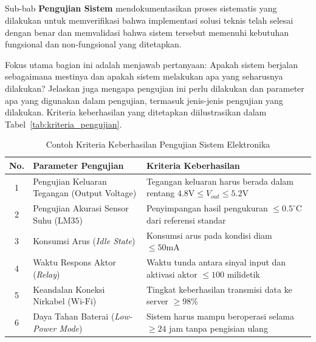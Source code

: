 \documentclass{elsinta}
\begin{document}
\subsection{\SystemTestingTitle}


Sub-bab \textbf{Pengujian Sistem} mendokumentasikan proses sistematis yang dilakukan untuk memverifikasi bahwa implementasi solusi teknis telah selesai dengan benar dan memvalidasi bahwa sistem tersebut memenuhi kebutuhan fungsional dan non-fungsional yang ditetapkan.

Fokus utama bagian ini adalah menjawab pertanyaan: Apakah sistem berjalan sebagaimana mestinya dan apakah sistem melakukan apa yang seharusnya dilakukan?
Jelaskan juga mengapa pengujian ini perlu dilakukan dan  parameter apa yang digunakan dalam pengujian, termasuk jenis-jenis pengujian yang dilakukan. Kriteria keberhasilan yang ditetapkan diilustrasikan dalam Tabel~\ref{tab:kriteria_pengujian}.

\begin{longtable}{|c|p{5cm}|p{8cm}|}
    \caption{Contoh Kriteria Keberhasilan Pengujian Sistem Elektronika}
    \label{tab:kriteria_pengujian_elektro}
    \\ %

    \hline
    \textbf{No.} & \textbf{Parameter Pengujian} & \textbf{Kriteria Keberhasilan} \\
    \hline
    \endhead %

    \hline
    1 & Pengujian Keluaran Tegangan (Output Voltage) & Tegangan keluaran harus berada dalam rentang $4.8 \text{V} \leq V_{out} \leq 5.2 \text{V}$ \\
    \hline
    2 & Pengujian Akurasi Sensor Suhu ($\text{LM35}$) & Penyimpangan hasil pengukuran $\leq 0.5^\circ \text{C}$ dari referensi standar \\
    \hline
    3 & Konsumsi Arus (\textit{Idle State}) & Konsumsi arus pada kondisi diam $\leq 50 \text{mA}$ \\
    \hline
    4 & Waktu Respons Aktor (\textit{Relay}) & Waktu tunda antara sinyal input dan aktivasi aktor $\leq 100$ milidetik \\
    \hline
    5 & Keandalan Koneksi Nirkabel ($\text{Wi-Fi}$) & Tingkat keberhasilan transmisi data ke server $\geq 98\%$ \\
    \hline
    6 & Daya Tahan Baterai (\textit{Low-Power Mode}) & Sistem harus mampu beroperasi selama $\geq 24$ jam tanpa pengisian ulang \\
    \hline
\end{longtable}
\end{document}
